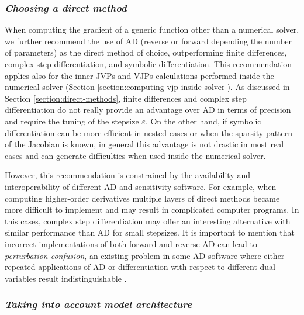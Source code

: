 \subsubsection*{\textit{Choosing a direct method}}

When computing the gradient of a generic function other than a numerical solver, we further recommend the use of AD (reverse or forward depending the number of parameters) as the direct method of choice, outperforming finite differences, complex step differentiation, and symbolic differentiation. 
This recommendation applies also for the inner JVPs and VJPs calculations performed inside the numerical solver (Section \ref{section:computing-vjp-inside-solver}).
As discussed in Section \ref{section:direct-methods}, finite differences and complex step differentiation do not really provide an advantage over AD in terms of precision and require the tuning of the stepsize $\varepsilon$. 
On the other hand, if symbolic differentiation can be more efficient in nested cases or when the sparsity pattern of the Jacobian is known, in general this advantage is not drastic in most real cases and can generate difficulties when used inside the numerical solver. 

However, this recommendation is constrained by the availability and interoperability of different AD and sensitivity software. 
For example, when computing higher-order derivatives multiple layers of direct methods became more difficult to implement and may result in complicated computer programs.
In this cases, complex step differentiation may offer an interesting alternative with similar performance than AD for small stepsizes. 
It is important to mention that incorrect implementations of both forward and reverse AD can lead to \textit{perturbation confusion}, an existing problem in some AD software where either repeated applications of AD or differentiation with respect to different dual variables result indistinguishable \cite{siskind2005perturbation, manzyuk2019perturbation}. 


\subsubsection*{\textit{Taking into account model architecture}}

